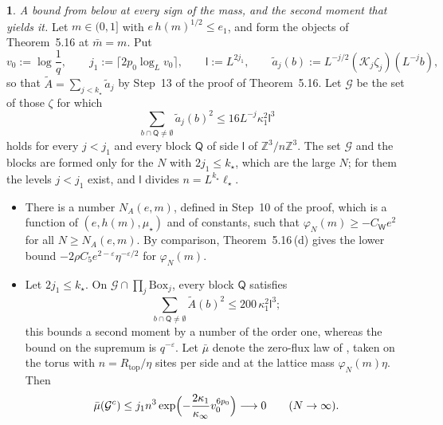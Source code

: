 \documentclass[11pt]{amsart}
\newcommand{\namedhead}{}
\theoremstyle{definition}
\newtheorem*{namedinner}{\namedhead}
\newenvironment{named}[1]{\renewcommand{\namedhead}{#1}\begin{namedinner}}{\end{namedinner}}
\begin{document}
\begin{named}{Proposition 6.2}
\emph{A bound from below at every sign of the mass, and the second moment that yields it.}
Let $m\in(0,1]$ with $e\,h(m)^{1/2}\le e_1$, and form the objects of Theorem~5.16 at $\bar m=m$.
Put
\begin{equation*}
v_0:=\log\frac1q,\qquad j_1:=\lceil2p_0\log_Lv_0\rceil,\qquad\mathsf l:=L^{2j_1},\qquad\tilde a_j(b):=L^{-j/2}(\mathcal K_j\zeta_j)(L^{-j}b),
\end{equation*}
so that $\tilde A=\sum_{j<k_\star}\tilde a_j$ by Step~13 of the proof of Theorem~5.16.
Let $\mathcal G$ be the set of those $\zeta$ for which
\begin{equation*}
\sum_{b\cap\mathsf Q\ne\emptyset}\tilde a_j(b)^2\le16L^{-j}\kappa_1^2\mathsf l^3
\end{equation*}
holds for every $j<j_1$ and every block $\mathsf Q$ of side $\mathsf l$ of $\mathbb Z^3/n\mathbb Z^3$.
The set $\mathcal G$ and the blocks are formed only for the $N$ with $2j_1\le k_\star$, which are the large $N$;
for them the levels $j<j_1$ exist, and $\mathsf l$ divides $n=L^{k_\star}\ell_\star$.
\begin{itemize}
\item[(a)] There is a number $N_A(e,m)$, defined in Step~10 of the proof, which is a function of $(e,h(m),\mu_\star)$ and of constants, such that $\varphi_N(m)\ge-C_{\mathsf W}e^2$ for all $N\ge N_A(e,m)$.
By comparison, Theorem~5.16\,(d) gives the lower bound $-2\rho C_5e^{2-\varepsilon}\eta^{-\varepsilon/2}$ for $\varphi_N(m)$.
\item[(b)] Let $2j_1\le k_\star$.
On $\mathcal G\cap\prod_j\mathrm{Box}_j$, every block $\mathsf Q$ satisfies
\begin{equation*}
\sum_{b\cap\mathsf Q\ne\emptyset}\tilde A(b)^2\le200\,\kappa_1^2\mathsf l^3;
\end{equation*}
this bounds a second moment by a number of the order one, whereas the bound on the supremum is $q^{-\varepsilon}$.
Let $\bar\mu$ denote the zero-flux law of \cite[Proposition~31.1]{QEDIII}, taken on the torus with $n=R_{\mathrm{top}}/\eta$ sites per side and at the lattice mass $\varphi_N(m)\eta$.
Then
\begin{equation*}
\bar\mu(\mathcal G^c)\le j_1n^3\exp\Bigl(-\frac{2\kappa_1}{\kappa_\infty}v_0^{6p_0}\Bigr)\longrightarrow0\qquad(N\to\infty).
\end{equation*}
\end{itemize}
\end{named}
\end{document}
